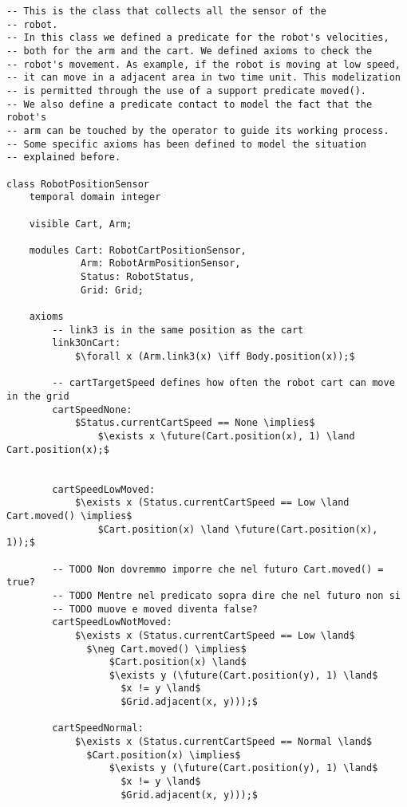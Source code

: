 \begin{lstlisting}[fontadjust, mathescape, frame=single] 
-- This is the class that collects all the sensor of the
-- robot.
-- In this class we defined a predicate for the robot's velocities,
-- both for the arm and the cart. We defined axioms to check the
-- robot's movement. As example, if the robot is moving at low speed,
-- it can move in a adjacent area in two time unit. This modelization
-- is permitted through the use of a support predicate moved().
-- We also define a predicate contact to model the fact that the robot's
-- arm can be touched by the operator to guide its working process.
-- Some specific axioms has been defined to model the situation
-- explained before.

class RobotPositionSensor
    temporal domain integer

    visible Cart, Arm;

    modules Cart: RobotCartPositionSensor,
             Arm: RobotArmPositionSensor,
             Status: RobotStatus,
             Grid: Grid;

    axioms
        -- link3 is in the same position as the cart
        link3OnCart: 
            $\forall x (Arm.link3(x) \iff Body.position(x));$

        -- cartTargetSpeed defines how often the robot cart can move in the grid
        cartSpeedNone: 
            $Status.currentCartSpeed == None \implies$ 
                $\exists x \future(Cart.position(x), 1) \land Cart.position(x);$

                
        cartSpeedLowMoved: 
            $\exists x (Status.currentCartSpeed == Low \land Cart.moved() \implies$
                $Cart.position(x) \land \future(Cart.position(x), 1));$

        -- TODO Non dovremmo imporre che nel futuro Cart.moved() = true?
        -- TODO Mentre nel predicato sopra dire che nel futuro non si
        -- TODO muove e moved diventa false?
        cartSpeedLowNotMoved: 
            $\exists x (Status.currentCartSpeed == Low \land$
              $\neg Cart.moved() \implies$
                  $Cart.position(x) \land$ 
                  $\exists y (\future(Cart.position(y), 1) \land$ 
                    $x != y \land$ 
                    $Grid.adjacent(x, y)));$

        cartSpeedNormal: 
            $\exists x (Status.currentCartSpeed == Normal \land$
              $Cart.position(x) \implies$
                  $\exists y (\future(Cart.position(y), 1) \land$
                    $x != y \land$
                    $Grid.adjacent(x, y)));$


\end{lstlisting}
